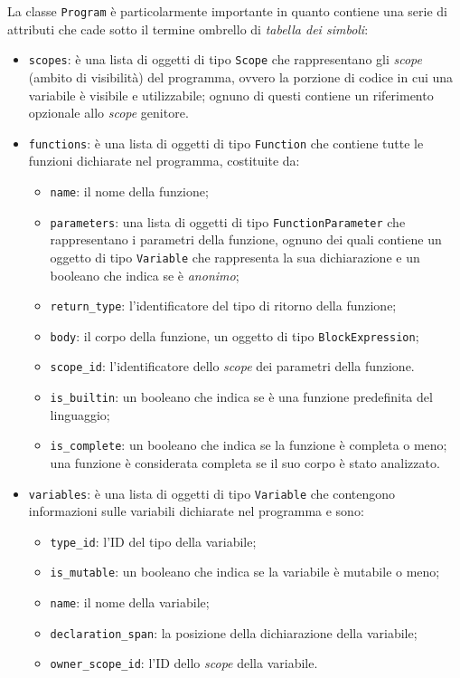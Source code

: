 La classe \texttt{Program} \`e particolarmente importante in quanto contiene una serie di attributi che cade sotto il termine ombrello di \emph{tabella dei simboli}:
\begin{itemize}
	\item \texttt{scopes}: \`e una lista di oggetti di tipo \texttt{Scope} che rappresentano gli \emph{scope} (ambito di visibilit\`a) del programma, ovvero la porzione di codice in cui una variabile \`e visibile e utilizzabile; ognuno di questi contiene un riferimento opzionale allo \textit{scope} genitore.
	\item \texttt{functions}: \`e una lista di oggetti di tipo \texttt{Function} che contiene tutte le funzioni dichiarate nel programma, costituite da:
	\begin{itemize}
		\item \texttt{name}: il nome della funzione;
		\item \texttt{parameters}: una lista di oggetti di tipo \texttt{FunctionParameter} che rappresentano i parametri della funzione, ognuno dei quali contiene un oggetto di tipo \texttt{Variable} che rappresenta la sua dichiarazione e un booleano che indica se \`e \emph{anonimo};
		\item \texttt{return\_type}: l'identificatore del tipo di ritorno della funzione;
		\item \texttt{body}: il corpo della funzione, un oggetto di tipo \texttt{BlockExpression};
		\item \texttt{scope\_id}: l'identificatore dello \textit{scope} dei parametri della funzione.
		\item \texttt{is\_builtin}: un booleano che indica se \`e una funzione predefinita del linguaggio;
		\item \texttt{is\_complete}: un booleano che indica se la funzione \`e completa o meno; una funzione \`e considerata completa se il suo corpo \`e stato analizzato.
	\end{itemize}
	\item \texttt{variables}: è una lista di oggetti di tipo \texttt{Variable} che contengono informazioni sulle variabili dichiarate nel programma e sono:
	\begin{itemize}
		\item \texttt{type\_id}: l'ID del tipo della variabile;
		\item \texttt{is\_mutable}: un booleano che indica se la variabile \`e mutabile o meno;
		\item \texttt{name}: il nome della variabile;
		\item \texttt{declaration\_span}: la posizione della dichiarazione della variabile;
		\item \texttt{owner\_scope\_id}: l'ID dello \emph{scope} della variabile.
	\end{itemize}
\end{itemize}

